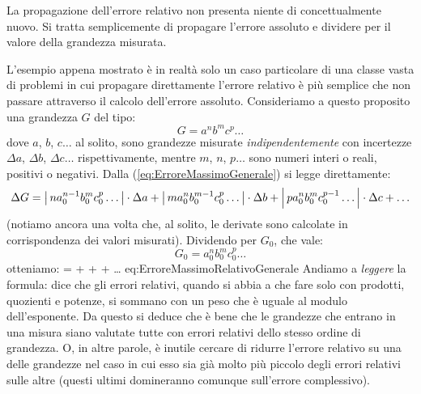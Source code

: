 La propagazione dell'errore relativo non presenta niente di
concettualmente nuovo. Si tratta semplicemente di propagare l'errore
assoluto e dividere per il valore della grandezza misurata.


\begin{exemplify}


\end{exemplify}

\noindent L'esempio appena mostrato \`e in realt\`a solo un caso particolare
di una classe vasta di problemi in cui propagare direttamente l'errore
relativo \`e pi\`u semplice che non passare attraverso il calcolo
dell'errore assoluto.
Consideriamo a questo proposito una grandezza $G$ del tipo:
$$
G = a^n  b^m  c^p \ldots
$$
dove
$a$, $b$, $c\ldots$ al solito, sono grandezze misurate
{\itshape indipendentemente} con incertezze $\Delta a$, $\Delta b$,
$\Delta c\ldots$ rispettivamente, mentre $m$, $n$, $p\ldots$ sono
numeri interi o reali, positivi o negativi.
Dalla (\ref{eq:ErroreMassimoGenerale}) si legge direttamente:
$$
\Delta G =
\left| \, n  a_0^{n-1} b_0^m c_0^p \ldots \, \right|\cdot \Delta a +
\left| \, m a_0^n b_0^{m-1} c_0^p \ldots \, \right|\cdot \Delta b +
\left| \, p a_0^n b_0^m c_0^{p-1} \ldots \, \right|\cdot \Delta c + \ldots
$$
(notiamo ancora una volta che, al solito, le derivate sono calcolate
in corrispondenza dei valori misurati).
Dividendo per $G_0$, che vale:
$$
G_0 = a_0^n b_0^m c_0^p \ldots
$$
otteniamo:
\eqnlbox
{ =
 +
 +
 + \ldots}
{eq:ErroreMassimoRelativoGenerale}
Andiamo a {\itshape leggere} la formula: dice che gli errori relativi,
quando si abbia a che fare solo con prodotti, quozienti e potenze,
si sommano con un peso che \`e uguale al modulo dell'esponente.
Da questo si deduce che \`e bene che le grandezze che entrano in una misura
siano valutate tutte con errori relativi dello stesso ordine di grandezza.
O, in altre parole, \`e inutile cercare di ridurre l'errore relativo su
una delle grandezze nel caso in cui esso sia gi\`a molto pi\`u piccolo
degli errori relativi sulle altre (questi ultimi domineranno comunque
sull'errore complessivo).


